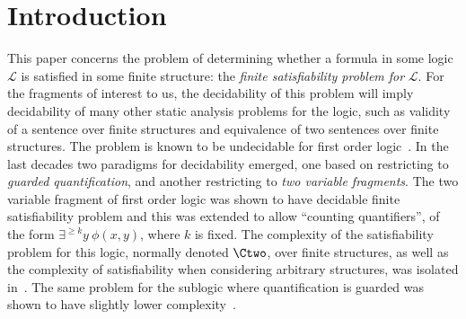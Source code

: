 \section{Introduction}\label{sec:intro}
This paper concerns the  problem of determining whether a formula in some logic $\mathcal{L}$ is satisfied in some finite structure: the \emph{finite satisfiability problem for} $\mathcal{L}$. For the fragments of interest to us, the decidability of this problem will imply decidability of many other static analysis problems for the logic, such as validity of a sentence over finite structures and equivalence of two sentences over finite structures.
The problem is known
to be undecidable for first order logic~\cite{traktenbrot}. 
In the last decades two paradigms for decidability emerged, one based on restricting to \emph{guarded quantification}, and another restricting to \emph{two variable fragments}.
The two variable fragment of first order logic was shown to have decidable finite satisfiability problem and this was extended to allow ``counting quantifiers'',  of the form $\exists^{\ge k} y ~ \phi(x,y)$, where $k$ is fixed. The complexity of the satisfiability problem for this logic, normally denoted $\Ctwo$, over finite structures, as well as the complexity of satisfiability when considering arbitrary structures, was isolated in~\cite{ctwocomplexity}. The same problem for the sublogic where quantification is guarded was shown 
to have slightly lower complexity~\cite{gctwocomplexity}.


